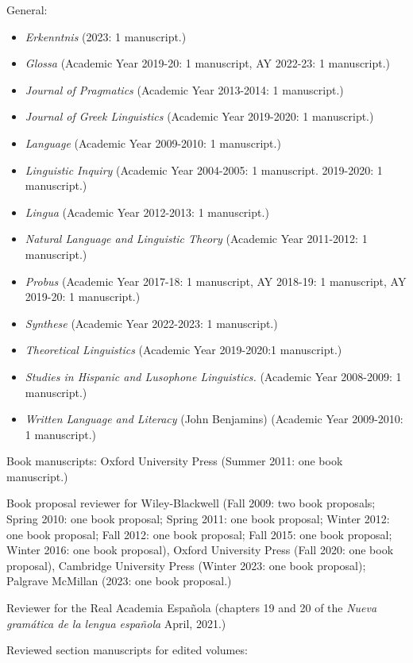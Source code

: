 \documentclass[11pt]{article}
\begin{document}
General:
\begin{itemize}
\item[] \textit{Erkenntnis} (2023: 1 manuscript.)
\item[] \textit{Glossa} (Academic Year 2019-20: 1 manuscript, AY 2022-23: 1 manuscript.)
\item[] \textit{Journal of Pragmatics} (Academic Year
  2013-2014: 1
  manuscript.)
  \item[] \textit{Journal of Greek Linguistics} (Academic Year
    2019-2020: 1
    manuscript.)
\item[] \textit{Language} (Academic Year  2009-2010: 1 manuscript.)
\item[] \textit{Linguistic Inquiry} (Academic Year  2004-2005: 1 manuscript. 2019-2020: 1 manuscript.)
\item[] \textit{Lingua} (Academic Year  2012-2013: 1 manuscript.)
\item[] \textit{Natural Language and Linguistic Theory} (Academic Year
  2011-2012: 1
  manuscript.)
  \item[] \textit{Probus} (Academic Year 2017-18: 1 manuscript, AY 2018-19: 1 manuscript, AY 2019-20: 1 manuscript.)
  \item[] \textit{Synthese} (Academic Year 2022-2023: 1 manuscript.)
  \item[] \textit{Theoretical Linguistics} (Academic Year 2019-2020:1 manuscript.)
\item[] \textit{Studies in Hispanic and Lusophone Linguistics.} (Academic Year 
  2008-2009: 1 manuscript.)
\item[] \textit{Written Language and Literacy} (John Benjamins) (Academic Year 
  2009-2010: 1 manuscript.)
\end{itemize}


Book manuscripts: Oxford University Press
(Summer 2011: one book manuscript.)

Book proposal reviewer for Wiley-Blackwell (Fall 2009: two book
proposals; Spring 2010: one book
proposal; Spring 2011: one book proposal; Winter 2012: one book
proposal; Fall 2012: one book proposal; Fall 2015: one book proposal; Winter 2016: one book proposal), Oxford University Press (Fall 2020: one book proposal), Cambridge University Press (Winter 2023: one book proposal); Palgrave McMillan (2023: one book proposal.)

Reviewer for the Real Academia Espa\~nola (chapters 19 and 20 of the \textit{Nueva gramática de la lengua española} April, 2021.)

Reviewed section manuscripts for edited volumes: 
\end{document}
